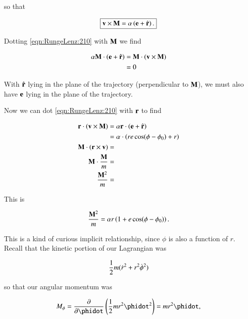 so that 

\begin{equation}\label{eqn:RungeLenz:210}
\boxed{
\mathbf{v} \times \mathbf{M} = \alpha \left(\mathbf{e} + \hat{\mathbf{r}} \right).
}
\end{equation}

Dotting \ref{eqn:RungeLenz:210} with $\mathbf{M}$ we find

\begin{align*}
\alpha \mathbf{M} \cdot \left(\mathbf{e} + \hat{\mathbf{r}} \right)
&=
\mathbf{M} \cdot (\mathbf{v} \times \mathbf{M}) \\
&= 0
\end{align*}

With $\hat{\mathbf{r}}$ lying in the plane of the trajectory (perpendicular to $\mathbf{M}$), we must also have $\mathbf{e}$ lying in the plane of the trajectory.

Now we can dot \ref{eqn:RungeLenz:210} with $\mathbf{r}$ to find

\begin{align*}
\mathbf{r} \cdot (\mathbf{v} \times \mathbf{M}) 
&= \alpha \mathbf{r} \cdot \left(\mathbf{e} + \hat{\mathbf{r}} \right) \\ 
&= \alpha \cdot \left( r e \cos(\phi - \phi_0) + r \right) \\
\mathbf{M} \cdot (\mathbf{r} \times \mathbf{v}) &= \\
\mathbf{M} \cdot \frac{\mathbf{M}}{m} &= \\
\frac{\mathbf{M}^2}{m} &=
\end{align*}

This is

\begin{equation}\label{eqn:RungeLenz:230}
\frac{\mathbf{M}^2}{m} = \alpha r \left( 1 + e \cos(\phi - \phi_0) \right).
\end{equation}

This is a kind of curious implicit relationship, since $\phi$ is also a function of $r$.  Recall that the kinetic portion of our Lagrangian was

\begin{equation}\label{eqn:RungeLenz:250}
\frac{1}{2} m (\dot{r}^2 + r^2 \dot{\phi}^2 )
\end{equation}

so that our angular momentum was

\begin{equation}\label{eqn:RungeLenz:270}
M_\phi = \PD{\phidot}{} \left( \inv{2} m r^2 \phidot^2 \right) = m r^2 \phidot,
\end{equation}


